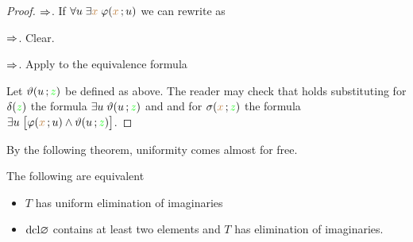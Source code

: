 
\begin{proof}
$\Rightarrow$.
If $\forall u\;\exists{\color{brown}x}\;\varphi({\color{brown} x}\,;u)$ we can rewrite  as 


$\Rightarrow$.
Clear.

$\Rightarrow$.
Apply  to the equivalence formula


Let $\vartheta(u\,;{\color{green} z})$ be defined as above.
The reader may check that  holds substituting for $\delta({\color{green} z})$ the formula $\exists u\;\vartheta(u\,;{\color{green} z})$ and and for $\sigma({\color{brown} x}\,;{\color{green} z})$ the formula $\exists u\;\big[\varphi({\color{brown} x}\,;u)\wedge\vartheta(u\,;{\color{green} z})\big]$.
\end{proof}

By the following theorem, uniformity comes almost for free.

\begin{theorem}\label{thm_ei_unif} The following are equivalent
\begin{itemize}
\item[1.] $T$ has uniform elimination of imaginaries
\item[2.] ${\rm dcl}\varnothing$ contains at least two elements and $T$ has elimination of imaginaries.
\end{itemize}
\end{theorem}


